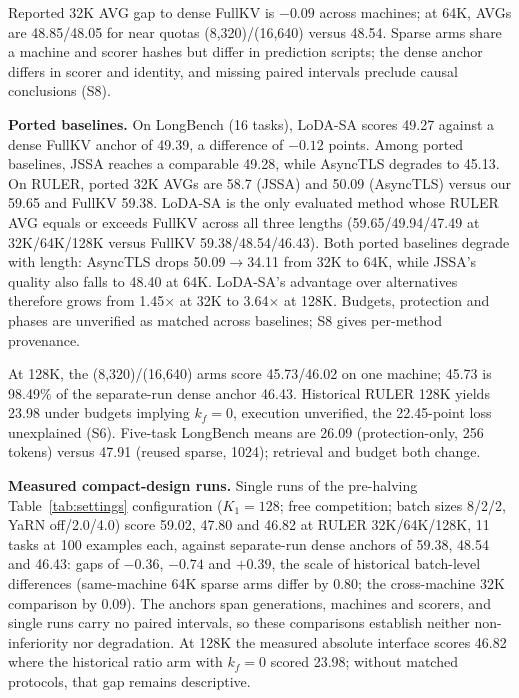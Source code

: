 \documentclass[conference,9pt,letterpaper]{IEEEtran}
\begin{document}
Reported 32K AVG gap to dense FullKV is $-0.09$ across machines; at 64K, AVGs are 48.85/48.05 for near quotas (8,320)/(16,640) versus 48.54. Sparse arms share a machine and scorer hashes but differ in prediction scripts; the dense anchor differs in scorer and identity, and missing paired intervals preclude causal conclusions (S8).

\textbf{Ported baselines.} On LongBench (16 tasks), LoDA-SA scores 49.27 against a dense FullKV anchor of 49.39, a difference of $-0.12$ points. Among ported baselines, JSSA reaches a comparable 49.28, while AsyncTLS degrades to 45.13. On RULER, ported 32K AVGs are 58.7 (JSSA) and 50.09 (AsyncTLS) versus our 59.65 and FullKV 59.38. LoDA-SA is the only evaluated method whose RULER AVG equals or exceeds FullKV across all three lengths (59.65/49.94/47.49 at 32K/64K/128K versus FullKV 59.38/48.54/46.43). Both ported baselines degrade with length: AsyncTLS drops 50.09$\rightarrow$34.11 from 32K to 64K, while JSSA's quality also falls to 48.40 at 64K. LoDA-SA's advantage over alternatives therefore grows from 1.45$\times$ at 32K to 3.64$\times$ at 128K. Budgets, protection and phases are unverified as matched across baselines; S8 gives per-method provenance.

At 128K, the (8,320)/(16,640) arms score 45.73/46.02 on one machine; 45.73 is 98.49\% of the separate-run dense anchor 46.43. Historical RULER 128K yields 23.98 under budgets implying $k_f=0$, execution unverified, the 22.45-point loss unexplained (S6). Five-task LongBench means are 26.09 (protection-only, 256 tokens) versus 47.91 (reused sparse, 1024); retrieval and budget both change.

\textbf{Measured compact-design runs.} Single runs of the pre-halving Table~\ref{tab:settings} configuration ($K_1{=}128$; free competition; batch sizes 8/2/2, YaRN off/2.0/4.0) score 59.02, 47.80 and 46.82 at RULER 32K/64K/128K, 11 tasks at 100 examples each, against separate-run dense anchors of 59.38, 48.54 and 46.43: gaps of $-0.36$, $-0.74$ and $+0.39$, the scale of historical batch-level differences (same-machine 64K sparse arms differ by 0.80; the cross-machine 32K comparison by 0.09). The anchors span generations, machines and scorers, and single runs carry no paired intervals, so these comparisons establish neither non-inferiority nor degradation. At 128K the measured absolute interface scores 46.82 where the historical ratio arm with $k_f=0$ scored 23.98; without matched protocols, that gap remains descriptive.
\end{document}
